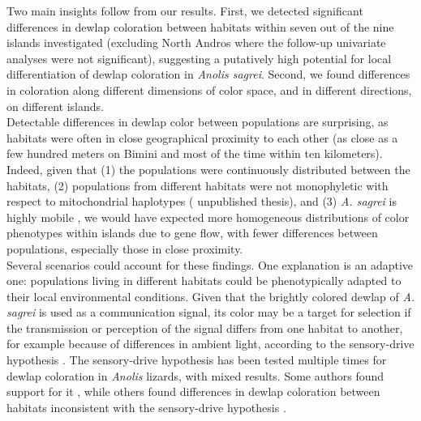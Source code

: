 Two main insights follow from our results. First, we detected significant differences in dewlap coloration between habitats within seven out of the nine islands investigated (excluding North Andros where the follow-up univariate analyses were not significant), suggesting a putatively high potential for local differentiation of dewlap coloration in \textit{Anolis sagrei}. Second, we found differences in coloration along different dimensions of color space, and in different directions, on different islands.\\

Detectable differences in dewlap color between populations are surprising, as habitats were often in close geographical proximity to each other (as close as a few hundred meters on Bimini and most of the time within ten kilometers). Indeed, given that (1) the populations were continuously distributed between the habitats, (2) populations from different habitats were not monophyletic with respect to mitochondrial haplotypes (\citealt{vandeSchoot2016} unpublished thesis), and (3) \textit{A. sagrei} is highly mobile \citep{Kamath2018}, we would have expected more homogeneous distributions of color phenotypes within islands due to gene flow, with fewer differences between populations, especially those in close proximity.\\

Several scenarios could account for these findings. One explanation is an adaptive one: populations living in different habitats could be phenotypically adapted to their local environmental conditions. Given that the brightly colored dewlap of \textit{A. sagrei} is used as a communication signal, its color may be a target for selection if the transmission or perception of the signal differs from one habitat to another, for example because of differences in ambient light, according to the sensory-drive hypothesis \citep{Endler1988, Endler1992, Endler1998}. The sensory-drive hypothesis has been tested multiple times for dewlap coloration in \textit{Anolis} lizards, with mixed results. Some authors found support for it \citep{Leal2002, Leal2004}, while others found differences in dewlap coloration between habitats inconsistent with the sensory-drive hypothesis \citep{Fleishman2009, Ng2012}.\\

